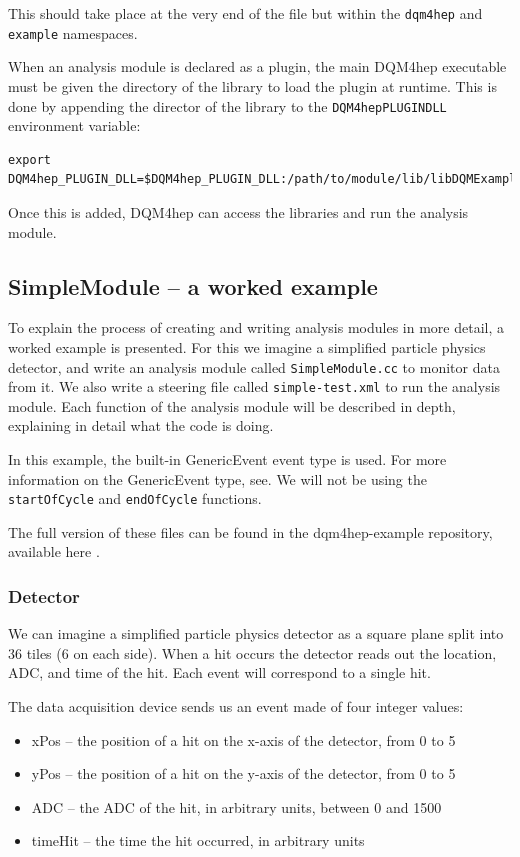 This should take place at the very end of the file but within the \texttt{dqm4hep} and \texttt{example} namespaces.

When an analysis module is declared as a plugin, the main \acrshort{DQM4hep} executable must be given the directory of the library to load the plugin at runtime. This is done by appending the director of the library to the \texttt{DQM4hep\textunderscore PLUGIN\textunderscore DLL} environment variable:

\begin{lstlisting}
export DQM4hep_PLUGIN_DLL=$DQM4hep_PLUGIN_DLL:/path/to/module/lib/libDQMExample.so
\end{lstlisting}

Once this is added, \acrshort{DQM4hep} can access the libraries and run the analysis module.

\subsection{SimpleModule – a worked example} 
To explain the process of creating and writing analysis modules in more detail, a worked example is presented. For this we imagine a simplified particle physics detector, and write an analysis module called \texttt{SimpleModule.cc} to monitor data from it. We also write a steering file called \texttt{simple-test.xml} to run the analysis module. Each function of the analysis module will be described in depth, explaining in detail what the code is doing. 

In this example, the built-in GenericEvent event type is used. For more information on the GenericEvent type, see . We will not be using the \texttt{startOfCycle} and \texttt{endOfCycle} functions.

The full version of these files can be found in the dqm4hep-example repository, available here  .

\subsubsection{Detector}
We can imagine a simplified particle physics detector as a square plane split into 36 tiles (6 on each side). When a hit occurs the detector reads out the location, \acrshort{ADC}, and time of the hit. Each event will correspond to a single hit.

The data acquisition device sends us an event made of four integer values:

\begin{itemize}
	\item xPos -- the position of a hit on the x-axis of the detector, from 0 to 5
	\item yPos -- the position of a hit on the y-axis of the detector, from 0 to 5
	\item ADC -- the \acrshort{ADC} of the hit, in arbitrary units, between 0 and 1500
	\item timeHit -- the time the hit occurred, in arbitrary units
\end{itemize}

